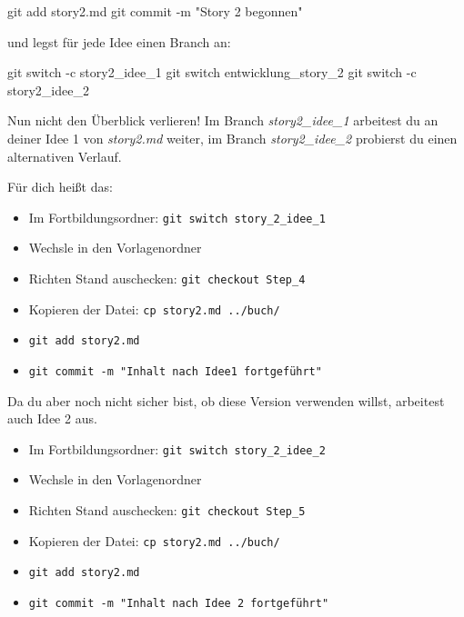\documentclass[
  letterpaper,
  DIV=11]{scrreprt}
\newenvironment{Shaded}{\begin{snugshade}}{\end{snugshade}}
\newcommand{\AttributeTok}[1]{\textcolor[rgb]{0.40,0.45,0.13}{#1}}
\newcommand{\FunctionTok}[1]{\textcolor[rgb]{0.28,0.35,0.67}{#1}}
\newcommand{\NormalTok}[1]{\textcolor[rgb]{0.00,0.23,0.31}{#1}}
\newcommand{\StringTok}[1]{\textcolor[rgb]{0.13,0.47,0.30}{#1}}
\providecommand{\tightlist}{%
  \setlength{\itemsep}{0pt}\setlength{\parskip}{0pt}}\usepackage{longtable,booktabs,array}
\newcommand{\datei}[1]{\textit{#1}\xspace}
\newcommand{\branch}[1]{\textit{#1}\xspace}
\begin{document}
\begin{Shaded}
\begin{Highlighting}[]
\FunctionTok{git}\NormalTok{ add story2.md }
\FunctionTok{git}\NormalTok{ commit }\AttributeTok{{-}m} \StringTok{"Story 2 begonnen"}
\end{Highlighting}
\end{Shaded}

und legst für jede Idee einen Branch an:

\begin{Shaded}
\begin{Highlighting}[]
\FunctionTok{git}\NormalTok{ switch }\AttributeTok{{-}c}\NormalTok{ story2\_idee\_1}
\FunctionTok{git}\NormalTok{ switch entwicklung\_story\_2}
\FunctionTok{git}\NormalTok{ switch }\AttributeTok{{-}c}\NormalTok{ story2\_idee\_2}
\end{Highlighting}
\end{Shaded}

Nun nicht den Überblick verlieren! Im Branch \branch{story2\_idee\_1}
arbeitest du an deiner Idee 1 von \datei{story2.md} weiter, im Branch
\branch{story2\_idee\_2} probierst du einen alternativen Verlauf.

Für dich heißt das:

\begin{itemize}
\tightlist
\item
  Im Fortbildungsordner: \texttt{git\ switch\ story\_2\_idee\_1}
\item
  Wechsle in den Vorlagenordner
\item
  Richten Stand auschecken: \texttt{git\ checkout\ Step\_4}
\item
  Kopieren der Datei: \texttt{cp\ story2.md\ ../buch/}
\item
  \texttt{git\ add\ story2.md}
\item
  \texttt{git\ commit\ -m\ "Inhalt\ nach\ Idee1\ fortgeführt"}
\end{itemize}

Da du aber noch nicht sicher bist, ob diese Version verwenden willst,
arbeitest auch Idee 2 aus.

\begin{itemize}
\tightlist
\item
  Im Fortbildungsordner: \texttt{git\ switch\ story\_2\_idee\_2}
\item
  Wechsle in den Vorlagenordner
\item
  Richten Stand auschecken: \texttt{git\ checkout\ Step\_5}
\item
  Kopieren der Datei: \texttt{cp\ story2.md\ ../buch/}
\item
  \texttt{git\ add\ story2.md}
\item
  \texttt{git\ commit\ -m\ "Inhalt\ nach\ Idee\ 2\ fortgeführt"}
\end{itemize}
\end{document}
